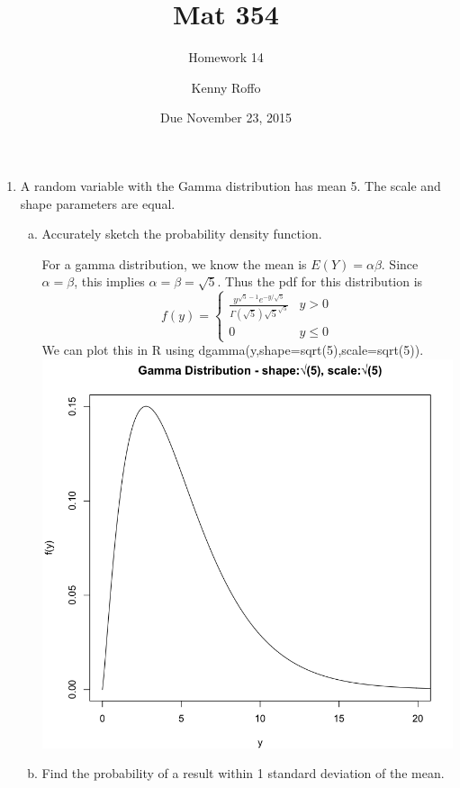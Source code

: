 \documentclass{scrartcl}
\title{Mat 354}
\subtitle{Homework 14}
\author{Kenny Roffo}
\date{Due November 23, 2015}
\begin{document}
\maketitle

\begin{enumerate}
  
\item A random variable with the Gamma distribution has mean 5. The scale and shape parameters are equal.

  \begin{enumerate}[a)]
  \item Accurately sketch the probability density function.

    For a gamma distribution, we know the mean is $E(Y) = \alpha\beta$. Since $\alpha=\beta$, this implies $\alpha=\beta=\sqrt{5}$.
    Thus the pdf for this distribution is $$f(y) = \begin{cases} \frac{y^{\sqrt{5}-1}e^{-y/\sqrt{5}}}{\Gamma(\sqrt{5})\sqrt{5}^{\sqrt{5}}} & y > 0 \\ 0 & y \le 0 \end{cases}$$ We can plot this in R using dgamma(y,shape=sqrt(5),scale=sqrt(5)).\\
    \includegraphics[keepaspectratio=true, scale=0.35]{1a.png}

  \item Find the probability of a result within 1 standard deviation of the mean.\\


\end{enumerate}
\end{enumerate}
\end{document}
